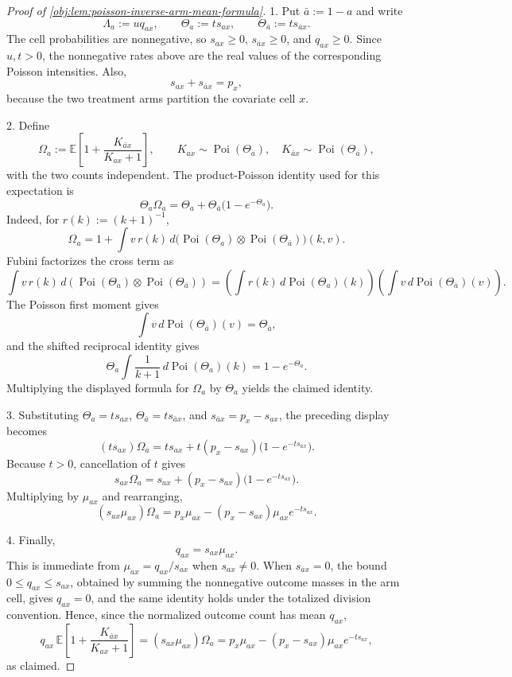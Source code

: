\begin{proof}[Proof of \cref{obj:lem:poisson-inverse-arm-mean-formula}]
1.  Put \(\bar a:=1-a\) and write
\[
\Lambda_a:=u q_{ax},\qquad
\Theta_a:=t s_{ax},\qquad
\Theta_{\bar a}:=t s_{\bar a x}.
\]
The cell probabilities are nonnegative, so \(s_{ax}\ge0\), \(s_{\bar a x}\ge0\), and \(q_{ax}\ge0\). Since \(u,t>0\), the nonnegative rates above are the real values of the corresponding Poisson intensities. Also,
\[
s_{ax}+s_{\bar a x}=p_x,
\]
because the two treatment arms partition the covariate cell \(x\). %

2.  Define
\[
\Omega_a:=
\mathbb E\!\left[
1+\frac{K_{\bar a x}}{K_{ax}+1}
\right],
\qquad
K_{ax}\sim\operatorname{Poi}(\Theta_a),\quad
K_{\bar a x}\sim\operatorname{Poi}(\Theta_{\bar a}),
\]
with the two counts independent. The product-Poisson identity used for this expectation is
\[
\Theta_a\Omega_a
=
\Theta_a+\Theta_{\bar a}\bigl(1-e^{-\Theta_a}\bigr).
\]
Indeed, for \(r(k):=(k+1)^{-1}\),
\[
\Omega_a
=
1+
\int v\,r(k)\,
d\bigl(\operatorname{Poi}(\Theta_a)\otimes\operatorname{Poi}(\Theta_{\bar a})\bigr)(k,v).
\]
Fubini factorizes the cross term as
\[
\int v\,r(k)\,d(\operatorname{Poi}(\Theta_a)\otimes\operatorname{Poi}(\Theta_{\bar a}))
=
\left(\int r(k)\,d\operatorname{Poi}(\Theta_a)(k)\right)
\left(\int v\,d\operatorname{Poi}(\Theta_{\bar a})(v)\right).
\]
The Poisson first moment gives
\[
\int v\,d\operatorname{Poi}(\Theta_{\bar a})(v)=\Theta_{\bar a},
\]
and the shifted reciprocal identity gives
\[
\Theta_a\int \frac{1}{k+1}\,d\operatorname{Poi}(\Theta_a)(k)
=
1-e^{-\Theta_a}.
\]
Multiplying the displayed formula for \(\Omega_a\) by \(\Theta_a\) yields the claimed identity. %

3.  Substituting \(\Theta_a=t s_{ax}\), \(\Theta_{\bar a}=t s_{\bar a x}\), and \(s_{\bar a x}=p_x-s_{ax}\), the preceding display becomes
\[
(t s_{ax})\Omega_a
=
t s_{ax}
+
t(p_x-s_{ax})\bigl(1-e^{-t s_{ax}}\bigr).
\]
Because \(t>0\), cancellation of \(t\) gives
\[
s_{ax}\Omega_a
=
s_{ax}
+
(p_x-s_{ax})\bigl(1-e^{-t s_{ax}}\bigr).
\]
Multiplying by \(\mu_{ax}\) and rearranging,
\[
(s_{ax}\mu_{ax})\Omega_a
=
p_x\mu_{ax}
-
(p_x-s_{ax})\mu_{ax}e^{-t s_{ax}}.
\]

4.  Finally,
\[
q_{ax}=s_{ax}\mu_{ax}.
\]
This is immediate from \(\mu_{ax}=q_{ax}/s_{ax}\) when \(s_{ax}\ne0\). When \(s_{ax}=0\), the bound \(0\le q_{ax}\le s_{ax}\), obtained by summing the nonnegative outcome masses in the arm cell, gives \(q_{ax}=0\), and the same identity holds under the totalized division convention. Hence, since the normalized outcome count has mean \(q_{ax}\),
\[
q_{ax}\,
\mathbb E\!\left[1+\frac{K_{\bar a x}}{K_{ax}+1}\right]
=
(s_{ax}\mu_{ax})\Omega_a
=
p_x\mu_{ax}
-
(p_x-s_{ax})\mu_{ax}e^{-t s_{ax}},
\]
as claimed. %
\end{proof}
